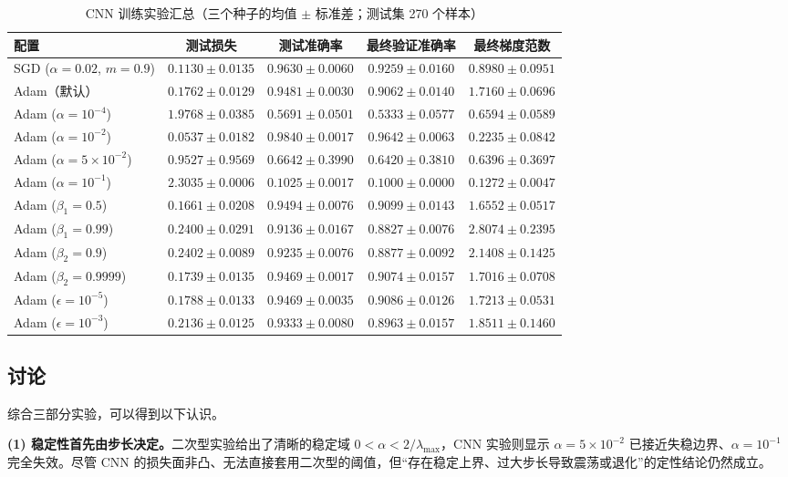 \documentclass[12pt,a4paper]{ctexart}
\begin{document}
\begin{table}[H]
\centering
\caption{CNN 训练实验汇总（三个种子的均值 $\pm$ 标准差；测试集 270 个样本）}
\label{tab:cnn}
\footnotesize
\setlength{\tabcolsep}{4pt}
\begin{tabular}{lcccc}
\toprule
配置 & 测试损失 & 测试准确率 & 最终验证准确率 & 最终梯度范数\\
\midrule
SGD ($\alpha=0.02$, $m=0.9$) & $0.1130\pm0.0135$ & $0.9630\pm0.0060$ & $0.9259\pm0.0160$ & $0.8980\pm0.0951$\\
Adam（默认） & $0.1762\pm0.0129$ & $0.9481\pm0.0030$ & $0.9062\pm0.0140$ & $1.7160\pm0.0696$\\
Adam ($\alpha=10^{-4}$) & $1.9768\pm0.0385$ & $0.5691\pm0.0501$ & $0.5333\pm0.0577$ & $0.6594\pm0.0589$\\
Adam ($\alpha=10^{-2}$) & $0.0537\pm0.0182$ & $0.9840\pm0.0017$ & $0.9642\pm0.0063$ & $0.2235\pm0.0842$\\
Adam ($\alpha=5\times10^{-2}$) & $0.9527\pm0.9569$ & $0.6642\pm0.3990$ & $0.6420\pm0.3810$ & $0.6396\pm0.3697$\\
Adam ($\alpha=10^{-1}$) & $2.3035\pm0.0006$ & $0.1025\pm0.0017$ & $0.1000\pm0.0000$ & $0.1272\pm0.0047$\\
Adam ($\beta_1=0.5$) & $0.1661\pm0.0208$ & $0.9494\pm0.0076$ & $0.9099\pm0.0143$ & $1.6552\pm0.0517$\\
Adam ($\beta_1=0.99$) & $0.2400\pm0.0291$ & $0.9136\pm0.0167$ & $0.8827\pm0.0076$ & $2.8074\pm0.2395$\\
Adam ($\beta_2=0.9$) & $0.2402\pm0.0089$ & $0.9235\pm0.0076$ & $0.8877\pm0.0092$ & $2.1408\pm0.1425$\\
Adam ($\beta_2=0.9999$) & $0.1739\pm0.0135$ & $0.9469\pm0.0017$ & $0.9074\pm0.0157$ & $1.7016\pm0.0708$\\
Adam ($\epsilon=10^{-5}$) & $0.1788\pm0.0133$ & $0.9469\pm0.0035$ & $0.9086\pm0.0126$ & $1.7213\pm0.0531$\\
Adam ($\epsilon=10^{-3}$) & $0.2136\pm0.0125$ & $0.9333\pm0.0080$ & $0.8963\pm0.0157$ & $1.8511\pm0.1460$\\
\bottomrule
\end{tabular}
\end{table}

\subsection{讨论}
综合三部分实验，可以得到以下认识。

\textbf{(1) 稳定性首先由步长决定。}二次型实验给出了清晰的稳定域 $0<\alpha<2/\lambda_{\max}$，CNN 实验则显示 $\alpha=5\times10^{-2}$ 已接近失稳边界、$\alpha=10^{-1}$ 完全失效。尽管 CNN 的损失面非凸、无法直接套用二次型的阈值，但“存在稳定上界、过大步长导致震荡或退化”的定性结论仍然成立。
\end{document}
